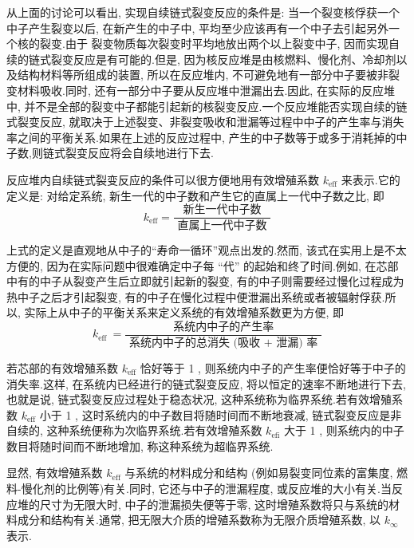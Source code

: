 \documentclass{Sichuan Normal University}
\begin{document}
从上面的讨论可以看出, 实现自续链式裂变反应的条件是: 当一个裂变核俘获一个中子产生裂变以后, 在新产生的中子中, 平均至少应该再有一个中子去引起另外一个核的裂变.由于
裂变物质每次裂变时平均地放出两个以上裂变中子, 因而实现自续的链式裂变反应是有可能的.但是, 因为核反应堆是由核燃料、慢化剂、冷却剂以及结构材料等所组成的装置, 所以在反应堆内, 不可避免地有一部分中子要被非裂变材料吸收.同时, 还有一部分中子要从反应堆中泄漏出去.因此, 在实际的反应堆中, 并不是全部的裂变中子都能引起新的核裂变反应.一个反应堆能否实现自续的链式裂变反应, 就取决于上述裂变、非裂变吸收和泄漏等过程中中子的产生率与消失率之间的平衡关系.如果在上述的反应过程中, 产生的中子数等于或多于消耗掉的中子数,则链式裂变反应将会自续地进行下去.

反应堆内自续链式裂变反应的条件可以很方便地用有效增殖系数 $k_{\mathrm{eff}}$ 来表示.它的定义是: 对给定系统, 新生一代的中子数和产生它的直属上一代中子数之比, 即
\begin{equation}
    k_{\mathrm{eff}}=\frac{\text { 新生一代中子数 }}{\text { 直属上一代中子数 }}
    \label{eq:有效增殖系数}
\end{equation}

上式的定义是直观地从中子的“寿命一循环”观点出发的.然而, 该式在实用上是不太方便的, 因为在实际问题中很难确定中子每 “代” 的起始和终了时间.例如, 在芯部中有的中子从裂变产生后立即就引起新的裂变, 有的中子则需要经过慢化过程成为热中子之后才引起裂变, 有的中子在慢化过程中便泄漏出系统或者被辐射俘获.所以, 实际上从中子的平衡关系来定义系统的有效增殖系数更为方便, 即
\begin{equation}
    k_{\text {eff }}=\frac{\text { 系统内中子的产生率 }}{\text { 系统内中子的总消失 (吸收 }+ \text { 泄漏) 率 }}
    \label{eq:有效增殖系数2}
\end{equation}

若芯部的有效增殖系数 $k_{\mathrm{eff}}$ 恰好等于 1 , 则系统内中子的产生率便恰好等于中子的消失率.这样, 在系统内已经进行的链式裂变反应, 将以恒定的速率不断地进行下去, 也就是说, 链式裂变反应过程处于稳态状况, 这种系统称为临界系统.若有效增殖系数 $k_{\mathrm{eff}}$ 小于 1 , 这时系统内的中子数目将随时间而不断地衰减, 链式裂变反应是非自续的, 这种系统便称为次临界系统.若有效增殖系数 $k_{\mathrm{efi}}$ 大于 1 , 则系统内的中子数目将随时间而不断地增加, 称这种系统为超临界系统.

显然, 有效增殖系数 $k_{\mathrm{eff}}$ 与系统的材料成分和结构 (例如易裂变同位素的富集度, 燃料-慢化剂的比例等)有关.同时, 它还与中子的泄漏程度, 或反应堆的大小有关.当反应堆的尺寸为无限大时, 中子的泄漏损失便等于零, 这时增殖系数将只与系统的材料成分和结构有关.通常, 把无限大介质的增殖系数称为无限介质增殖系数, 以 $k_{\infty}$ 表示.
\end{document}
